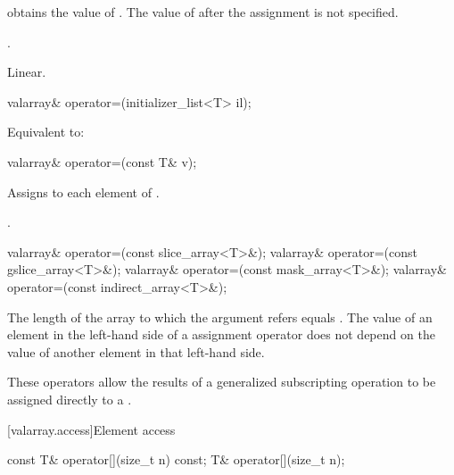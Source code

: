\begin{itemdescr}
\pnum
\effects {} obtains the value of .
The value of  after the assignment is not specified.

\pnum
\returns {}.

\pnum
\complexity Linear.
\end{itemdescr}

%
\begin{itemdecl}
valarray& operator=(initializer_list<T> il);
\end{itemdecl}

\begin{itemdescr}
\pnum
\effects Equivalent to: 
\end{itemdescr}


%
\begin{itemdecl}
valarray& operator=(const T& v);
\end{itemdecl}

\begin{itemdescr}
\pnum
\effects
Assigns  to each element of .

\pnum
\returns {}.
\end{itemdescr}

%
\begin{itemdecl}
valarray& operator=(const slice_array<T>&);
valarray& operator=(const gslice_array<T>&);
valarray& operator=(const mask_array<T>&);
valarray& operator=(const indirect_array<T>&);
\end{itemdecl}

\begin{itemdescr}
\pnum
\requires The length of the array to which the argument refers equals .
The value of an element in the left-hand side of a  assignment
operator does not depend on the value of another element in that left-hand side.

\pnum
These operators allow the results of a generalized subscripting operation
to be assigned directly to a
.
\end{itemdescr}

[valarray.access]{Element access}

%
\begin{itemdecl}
const T&  operator[](size_t n) const;
T& operator[](size_t n);
\end{itemdecl}

